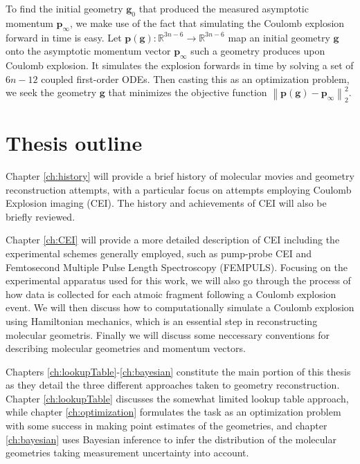 To find the initial geometry $\mathbf{g}_0$ that produced the measured asymptotic momentum $\mathbf{p}_\infty$, we make use of the fact that simulating the Coulomb explosion forward in time is easy. Let $\mathbf{p}(\mathbf{g}) : \mathbb{R}^{3n-6} \rightarrow \mathbb{R}^{3n-6}$ map an initial geometry $\mathbf{g}$ onto the asymptotic momentum vector $\mathbf{p}_\infty$ such a geometry produces upon Coulomb explosion. It simulates the explosion forwards in time by solving a set of $6n-12$ coupled first-order ODEs. Then casting this as an optimization problem, we seek the geometry $\mathbf{g}$ that minimizes the objective function $\left\| \mathbf{p}(\mathbf{g}) - \mathbf{p}_\infty \right\|_2^2$.

\section{Thesis outline}

Chapter \ref{ch:history} will provide a brief history of molecular movies and geometry reconstruction attempts, with a particular focus on attempts employing Coulomb Explosion imaging (CEI). The history and achievements of CEI will also be briefly reviewed.

Chapter \ref{ch:CEI} will provide a more detailed description of CEI including the experimental schemes generally employed, such as pump-probe CEI and Femtosecond Multiple Pulse Length Spectroscopy (FEMPULS). Focusing on the experimental apparatus used for this work, we will also go through the process of how data is collected for each atmoic fragment following a Coulomb explosion event. We will then discuss how to computationally simulate a Coulomb explosion using Hamiltonian mechanics, which is an essential step in reconstructing molecular geometris. Finally we will discuss some neccessary conventions for describing molecular geometries and momentum vectors.

Chapters \ref{ch:lookupTable}-\ref{ch:bayesian} constitute the main portion of this thesis as they detail the three different approaches taken to geometry reconstruction. Chapter \ref{ch:lookupTable} discusses the somewhat limited lookup table approach, while chapter \ref{ch:optimization} formulates the task as an optimization problem with some success in making point estimates of the geometries, and chapter \ref{ch:bayesian} uses Bayesian inference to infer the distribution of the molecular geometries taking measurement uncertainty into account.